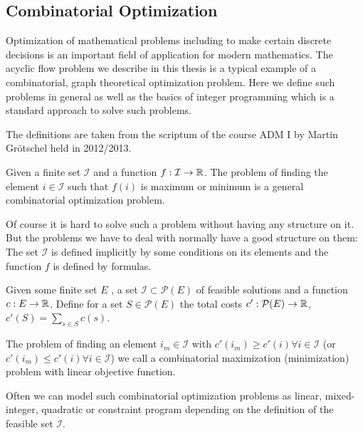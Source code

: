 
\subsection{Combinatorial Optimization}
Optimization of mathematical problems including to make certain discrete decisions is an important field of application 
for modern mathematics. The acyclic flow problem we describe in this thesis is a typical example of a combinatorial, 
graph theoretical optimization problem. Here we define such problems in general as well as the basics of integer 
programming which is a standard approach to solve such problems. 

The definitions are taken from the scriptum of the course ADM I by Martin Gr\"otschel held in 2012/2013. %

\begin{definition}
 Given a finite set $\mathcal{I}$ and a function $f:\mathcal{I}\to\mathbb{R}$. The problem of finding the element 
$i\in\mathcal{I}$ such that $f(i)$ is maximum or minimum is a general combinatorial optimization problem.
\end{definition}
Of course it is hard to solve such a problem without having any structure on it. But the problems we have to deal with 
normally have  a good structure on them: The set $\mathcal{I}$ is defined implicitly by some conditions on its elements 
and the function $f$ is defined by formulas.

\begin{definition}
 Given some finite set $E$ , a set $\mathcal{I}\subset \mathcal{P}(E)$ of feasible solutions and a function 
 $c:E\to \mathbb{R}$. Define for a set $S \in \mathcal{P}(E)$ the total costs $c':\mathcal{P}(E)\to \mathbb{R}$, 
 $c'(S)=\sum_{s\in S}c(s)$. 
 
 The problem of finding an element $i_m\in\mathcal{I}$ with $c'(i_m)\ge c'(i)\forall 
 i\in\mathcal{I} $ (or $c'(i_m)\le c'(i)\forall i\in\mathcal{I} $) we call a combinatorial maximization (minimization) 
 problem with linear objective function.
\end{definition}

Often we can model such combinatorial optimization problems as linear, mixed-integer, quadratic or constraint program 
depending on the definition of the feasible set $\mathcal{I}$. 

